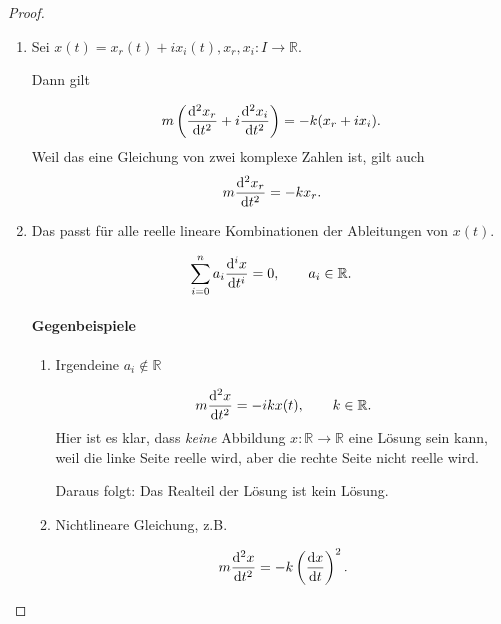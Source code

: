 \documentclass[prb,12pt]{revtex4-2}
\theoremstyle{definition}
\theoremstyle{definition}
\newcommand{\R}{\mathbb{R}}
\begin{document}
\begin{proof}
	\begin{enumerate}
		\item Sei $x(t)=x_r(t)+i x_i(t), x_r, x_i: I\to\R$.

			Dann gilt

			 \[
				 m\left( \dv[2]{x_r}{t}+i\dv[2]{x_i}{t} \right) =-k(x_r+ix_i)
			.\] 
			Weil das eine Gleichung von zwei komplexe Zahlen ist, gilt auch
			\[
				m\dv[2]{x_r}{t}=-kx_r
			.\] 
		\item Das passt f\"{u}r alle reelle lineare Kombinationen der Ableitungen von $x(t)$.

			\[
				\sum_{i=0}^n a_i\dv[i]{x}{t}=0, \qquad a_i\in \R
			.\] 
			\paragraph{Gegenbeispiele}
			\begin{enumerate}[label=(\roman*)]
				\item Irgendeine $a_i\not\in \R$

\[
	m\dv[2]{x}{t}=-ikx(t), \qquad k\in \R
.\] 
Hier ist es klar, dass \emph{keine} Abbildung $x:\R\to \R$ eine L\"{o}sung sein kann, weil die linke Seite reelle wird, aber die rechte Seite nicht reelle wird.

Daraus folgt: Das Realteil der L\"{o}sung ist kein L\"{o}sung.

\item Nichtlineare Gleichung, z.B.

\[
	m\dv[2]{x}{t}=-k\left( \dv{x}{t} \right) ^2
.\] 
			\end{enumerate}


\end{enumerate}
\end{proof}
\end{document}
